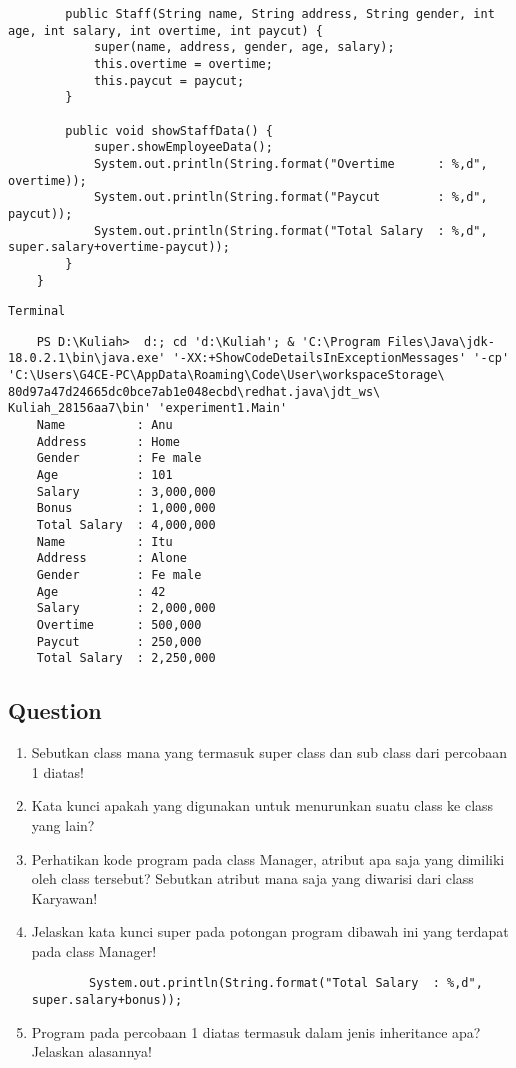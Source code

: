 \documentclass[12pt,titlepage]{article}
\begin{document}
\begin{verbatim}
        public Staff(String name, String address, String gender, int age, int salary, int overtime, int paycut) {
            super(name, address, gender, age, salary);
            this.overtime = overtime;
            this.paycut = paycut;
        }
        
        public void showStaffData() {
            super.showEmployeeData();
            System.out.println(String.format("Overtime      : %,d", overtime));
            System.out.println(String.format("Paycut        : %,d", paycut));
            System.out.println(String.format("Total Salary  : %,d", super.salary+overtime-paycut));
        }
    }
\end{verbatim}

\texttt{Terminal}
\begin{verbatim}
    PS D:\Kuliah>  d:; cd 'd:\Kuliah'; & 'C:\Program Files\Java\jdk-18.0.2.1\bin\java.exe' '-XX:+ShowCodeDetailsInExceptionMessages' '-cp' 'C:\Users\G4CE-PC\AppData\Roaming\Code\User\workspaceStorage\ 80d97a47d24665dc0bce7ab1e048ecbd\redhat.java\jdt_ws\ Kuliah_28156aa7\bin' 'experiment1.Main' 
    Name          : Anu
    Address       : Home
    Gender        : Fe male
    Age           : 101
    Salary        : 3,000,000
    Bonus         : 1,000,000
    Total Salary  : 4,000,000
    Name          : Itu
    Address       : Alone
    Gender        : Fe male
    Age           : 42
    Salary        : 2,000,000
    Overtime      : 500,000
    Paycut        : 250,000
    Total Salary  : 2,250,000
\end{verbatim}

\newpage

\subsection{Question}
\begin{enumerate}
    \item Sebutkan class mana yang termasuk super class dan sub class dari percobaan 1 diatas!
    \item Kata kunci apakah yang digunakan untuk menurunkan suatu class ke class yang lain?
    \item Perhatikan kode program pada class Manager, atribut apa saja yang dimiliki oleh class tersebut? Sebutkan atribut mana saja yang diwarisi dari class Karyawan!
    \item Jelaskan kata kunci super pada potongan program dibawah ini yang terdapat pada class Manager!
    \begin{verbatim}
        System.out.println(String.format("Total Salary  : %,d", super.salary+bonus)); 
    \end{verbatim}
    \item Program pada percobaan 1 diatas termasuk dalam jenis inheritance apa? Jelaskan alasannya!
\end{enumerate}
\end{document}
